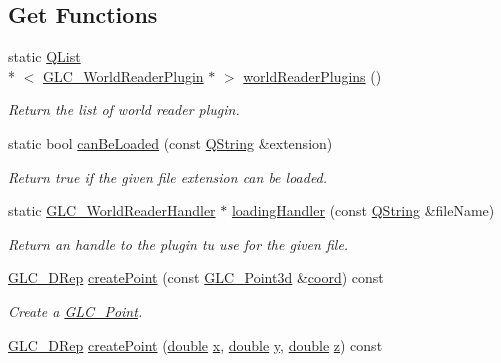 \subsection*{Get Functions}
\begin{DoxyCompactItemize}
\item 
static \hyperlink{class_q_list}{Q\-List}\\*
$<$ \hyperlink{class_g_l_c___world_reader_plugin}{G\-L\-C\-\_\-\-World\-Reader\-Plugin} $\ast$ $>$ \hyperlink{class_g_l_c___factory_a1b95f1d866144ad9114647ef73367d61}{world\-Reader\-Plugins} ()
\begin{DoxyCompactList}\small\item\em Return the list of world reader plugin. \end{DoxyCompactList}\item 
static bool \hyperlink{class_g_l_c___factory_aeb02ab16649e99863463c047d6e915e0}{can\-Be\-Loaded} (const \hyperlink{group___u_a_v_objects_plugin_gab9d252f49c333c94a72f97ce3105a32d}{Q\-String} \&extension)
\begin{DoxyCompactList}\small\item\em Return true if the given file extension can be loaded. \end{DoxyCompactList}\item 
static \hyperlink{class_g_l_c___world_reader_handler}{G\-L\-C\-\_\-\-World\-Reader\-Handler} $\ast$ \hyperlink{class_g_l_c___factory_a3ac4c430bba065f06789386312fe220c}{loading\-Handler} (const \hyperlink{group___u_a_v_objects_plugin_gab9d252f49c333c94a72f97ce3105a32d}{Q\-String} \&file\-Name)
\begin{DoxyCompactList}\small\item\em Return an handle to the plugin tu use for the given file. \end{DoxyCompactList}\item 
\hyperlink{class_g_l_c__3_d_rep}{G\-L\-C\-\_\-D\-Rep} \hyperlink{class_g_l_c___factory_a50fe465446dba40780bf9a545c4b9d56}{create\-Point} (const \hyperlink{glc__vector3d_8h_a4e13a9bbc7ab3d34de7e98b41836772c}{G\-L\-C\-\_\-\-Point3d} \&\hyperlink{glext_8h_a4ad6f000813afde2b5727cbfdddc75be}{coord}) const 
\begin{DoxyCompactList}\small\item\em Create a \hyperlink{class_g_l_c___point}{G\-L\-C\-\_\-\-Point}. \end{DoxyCompactList}\item 
\hyperlink{class_g_l_c__3_d_rep}{G\-L\-C\-\_\-D\-Rep} \hyperlink{class_g_l_c___factory_a5078842e903df1d9fe62773e4ffeee28}{create\-Point} (\hyperlink{_super_l_u_support_8h_a8956b2b9f49bf918deed98379d159ca7}{double} \hyperlink{glext_8h_a1db9d104e3c2128177f26aff7b46982f}{x}, \hyperlink{_super_l_u_support_8h_a8956b2b9f49bf918deed98379d159ca7}{double} \hyperlink{glext_8h_a42315f3ed8fff752bb47fd782309fcfc}{y}, \hyperlink{_super_l_u_support_8h_a8956b2b9f49bf918deed98379d159ca7}{double} \hyperlink{glext_8h_a642c8d69fd1a54f255c898df4f0dd7ca}{z}) const 

\end{DoxyCompactItemize}
